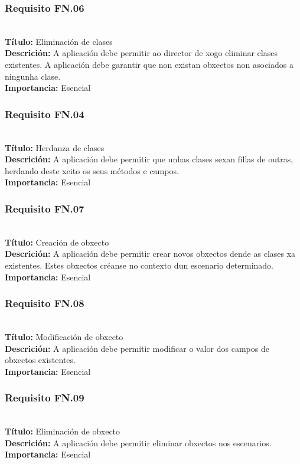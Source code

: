 \subsubsection{Requisito FN.06}~\\
{\bf Título:} Eliminación de clases\\
{\bf Descrición:} A aplicación debe permitir ao director de xogo eliminar clases
existentes. A aplicación debe garantir que non existan obxectos non asociados
a ningunha clase.\\
{\bf Importancia:} Esencial

\subsubsection{Requisito FN.04}~\\
{\bf Título:} Herdanza de clases\\
{\bf Descrición:} A aplicación debe permitir que unhas clases sexan
fillas de outras, herdando deste xeito os seus métodos e campos.\\
{\bf Importancia:} Esencial

\subsubsection{Requisito FN.07}~\\
{\bf Título:} Creación de obxecto\\
{\bf Descrición:} A aplicación debe permitir crear novos obxectos dende as
clases xa existentes. Estes obxectos créanse no contexto dun escenario
determinado.\\
{\bf Importancia:} Esencial

\subsubsection{Requisito FN.08}~\\
{\bf Título:} Modificación de obxecto\\
{\bf Descrición:} A aplicación debe permitir modificar o valor dos campos de
obxectos existentes.\\
{\bf Importancia:} Esencial

\subsubsection{Requisito FN.09}~\\
{\bf Título:} Eliminación de obxecto\\
{\bf Descrición:} A aplicación debe permitir eliminar obxectos nos escenarios.\\
{\bf Importancia:} Esencial

